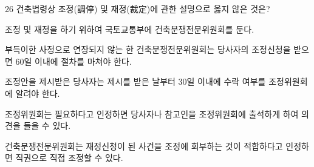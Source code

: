 \begin{question}{26}
건축법령상 조정(調停) 및 재정(裁定)에 관한 설명으로 옳지 않은 것은?
\begin{choices}
  \item 조정 및 재정을 하기 위하여 국토교통부에 건축분쟁전문위원회를 둔다.
  \item 부득이한 사정으로 연장되지 않는 한 건축분쟁전문위원회는 당사자의 조정신청을 받으면 60일 이내에 절차를 마쳐야 한다.
  \item 조정안을 제시받은 당사자는 제시를 받은 날부터 30일 이내에 수락 여부를 조정위원회에 알려야 한다.
  \item 조정위원회는 필요하다고 인정하면 당사자나 참고인을 조정위원회에 출석하게 하여 의견을 들을 수 있다.
  \item 건축분쟁전문위원회는 재정신청이 된 사건을 조정에 회부하는 것이 적합하다고 인정하면 직권으로 직접 조정할 수 있다.
\end{choices}
\end{question}

